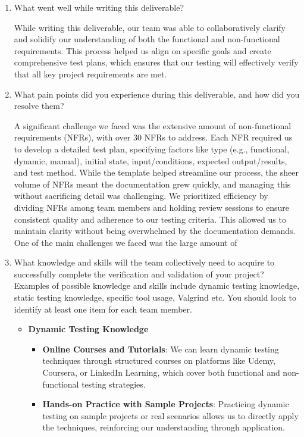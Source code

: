 \documentclass[12pt, titlepage]{article}
\begin{document}
\begin{enumerate}
  \item What went well while writing this deliverable? 

  While writing this deliverable, our team was able to collaboratively clarify and solidify 
  our understanding of both the functional and non-functional requirements. This process helped us align on 
  specific goals and create comprehensive test plans, which ensures that our testing will effectively verify 
  that all key project requirements are met.

  \item What pain points did you experience during this deliverable, and how
    did you resolve them?

  A significant challenge we faced was the extensive amount of non-functional requirements (NFRs), 
  with over 30 NFRs to address. Each NFR required us to develop a detailed test plan, specifying 
  factors like type (e.g., functional, dynamic, manual), initial state, input/conditions, expected 
  output/results, and test method. While the template helped streamline our process, the sheer volume 
  of NFRs meant the documentation grew quickly, and managing this without sacrificing detail was challenging. 
  We prioritized efficiency by dividing NFRs among team members and holding review sessions to ensure consistent 
  quality and adherence to our testing criteria. This allowed us to maintain clarity without being overwhelmed by 
  the documentation demands.
  One of the main challenges we faced was the large amount of 
  \item What knowledge and skills will the team collectively need to acquire to
  successfully complete the verification and validation of your project?
  Examples of possible knowledge and skills include dynamic testing knowledge,
  static testing knowledge, specific tool usage, Valgrind etc.  You should look to
  identify at least one item for each team member.
  \begin{itemize}
    \item \textbf{Dynamic Testing Knowledge}
    \begin{itemize}
        \item \textbf{Online Courses and Tutorials}: We can learn dynamic testing techniques through structured courses on platforms like Udemy, Coursera, or LinkedIn Learning, which cover both functional and non-functional testing strategies.
        \item \textbf{Hands-on Practice with Sample Projects}: Practicing dynamic testing on sample projects or real scenarios allows us to directly apply the techniques, reinforcing our understanding through application.
    \end{itemize}


\end{itemize}
\end{enumerate}
\end{document}
